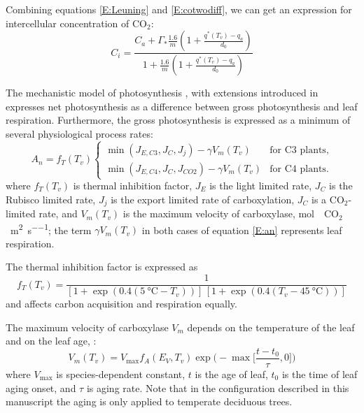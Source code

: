 \documentclass{article}
\newcommand{\qsat}{\ensuremath{q^\ast}}
\newcommand{\cotwo}{\ensuremath{\mathrm{CO_2}}}
\begin{document}
Combining equations \eqref{E:Leuning} and \eqref{E:cotwodiff}, we can get an
expression for intercellular concentration of \cotwo:
\begin{equation}
  C_i = \frac{
       C_a+\Gamma_*\frac{1.6}{m}\left( 1+\frac{\qsat(T_v)-q_a}{d_0} \right)
     }{
       1+\frac{1.6}{m}\left( 1+\frac{\qsat(T_v)-q_a}{d_0} \right)
     }
\end{equation}

The mechanistic model of photosynthesis \cite{Farquhar-etal-1980}, with
extensions introduced in \cite{Collatz-etal-1991,Collatz-etal-1992}   expresses
net photosynthesis as a difference between gross photosynthesis and leaf
respiration. Furthermore, the gross photosynthesis is expressed as a minimum of
several physiological process rates:
%
\begin{equation}\label{E:an}
   A_n = f_T(T_v) \begin{cases}
      \min(J_{E,C3}, J_C, J_j)     - \gamma V_m(T_v) & \text{for C3 plants}, \\
      \min(J_{E,C4}, J_C, J_{CO2}) - \gamma V_m(T_v) & \text{for C4 plants}.
   \end{cases}
\end{equation}
%
where 
$f_T(T_v)$ is thermal inhibition factor,
$J_E$ is the light limited rate, 
$J_C$ is the Rubisco limited rate,  
$J_j$ is the export limited rate of carboxylation, 
$J_C$ is a \cotwo -limited rate,
and $V_m(T_v)$ is the maximum velocity of carboxylase,
\si{\mole\of\cotwo\per\meter\squared\per\second}; the term $\gamma V_m(T_v)$
in both cases of equation \eqref{E:an} represents leaf respiration. 

The thermal inhibition factor is expressed as
%
\begin{equation}\label{e:thermal-inhibition}
   f_T(T_v) = 
   \frac{1}{
      \left[1+\exp(0.4(\SI{5}{\celsius} - T_v))\right]\,
      \left[1+\exp(0.4(T_v - \SI{45}{\celsius}))\right]
   }
\end{equation}
%
and affects carbon acquisition and respiration equally.

The maximum velocity of carboxylase $V_m$ depends on the temperature of the 
leaf and on the leaf age, \cite{Wilson-Baldocchi-etal-2001a}:
%
\begin{equation}
  V_m(T_v) = V_{\max} f_A(E_V,T_v) \exp\Big(-\max\Big[\frac{t-t_0}{\tau},0\Big]\Big)
\end{equation}
%
where $V_{\max}$ is species-dependent constant, 
$t$ is the age of leaf, $t_0$ is the time of leaf aging onset, and $\tau$ is 
aging rate.
Note that in the configuration described in this manuscript the aging is only
applied to temperate deciduous trees.
\end{document}
